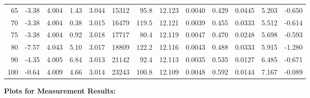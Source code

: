 \documentclass[10pt]{article}
\begin{document}
{\begin{tabular}{|r|rr|rr|rr|rr|rr|r|r|}
       65 &        -3.38 &        4.004 &         1.43 &        3.044 &        15312 &         95.8 &       12.123 &       0.0040 &        0.429 &       0.0445 &        5.203 &       -0.650 \\
       70 &        -3.38 &        4.004 &         0.38 &        3.015 &        16479 &        119.5 &       12.121 &       0.0039 &        0.455 &       0.0333 &        5.512 &       -0.614 \\
       75 &        -3.38 &        4.004 &         0.92 &        3.018 &        17717 &         80.4 &       12.119 &       0.0047 &        0.470 &       0.0248 &        5.698 &       -0.593 \\
       80 &        -7.57 &        4.043 &         5.10 &        3.017 &        18809 &        122.2 &       12.116 &       0.0043 &        0.488 &       0.0333 &        5.915 &       -1.280 \\
       90 &        -4.35 &        4.005 &         6.84 &        3.013 &        21142 &         92.4 &       12.113 &       0.0035 &        0.535 &       0.0127 &        6.485 &       -0.671 \\
      100 &        -0.64 &        4.009 &         4.66 &        3.014 &        23243 &        100.8 &       12.109 &       0.0048 &        0.592 &       0.0144 &        7.167 &       -0.089 \\
\hline
\end{tabular}
}

\vspace{3mm}






\pagebreak
\noindent
{\large \bf Plots for Measurement Results:}
\vspace{5mm}
\end{document}
